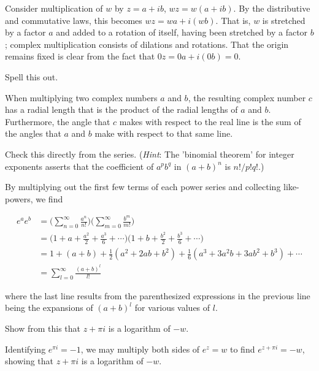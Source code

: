\documentclass[../the-road-to-reality.tex]{subfiles}
\begin{document}
\begin{questions}
\begin{solution}
	Consider multiplication of $w$ by $z = a + ib$, $wz = w(a + ib)$. By the distributive and commutative laws, this becomes $wz = wa + i(wb)$. That is, $w$ is stretched by a factor $a$ and added to a rotation of itself, having been stretched by a factor $b$; complex multiplication consists of dilations and rotations. That the origin remains fixed is clear from the fact that $0z = 0a + i(0b) = 0$.
\end{solution}

\question Spell this out.

\begin{solution}
	When multiplying two complex numbers $a$ and $b$, the resulting complex number $c$ has a radial length that is the product of the radial lengths of $a$ and $b$. Furthermore, the angle that $c$ makes with respect to the real line is the sum of the angles that $a$ and $b$ make with respect to that same line.
\end{solution}

\question Check this directly from the series. (\textit{Hint}: The 'binomial theorem' for integer exponents asserts that the coefficient of $a^pb^q$ in $(a + b)^n$ is $n!/p!q!$.)

\begin{solution}
	By multiplying out the first few terms of each power series and collecting like-powers, we find

	\begin{align*}
		e^ae^b &= \Big(\sum_{n=0}^{\infty}\frac{a^n}{n!}\Big)\Big(\sum_{m=0}^{\infty}\frac{b^m}{m!}\Big) \\
		&= \Big(1 + a + \frac{a^2}{2} + \frac{a^3}{6} + \cdots\Big)\Big(1 + b + \frac{b^2}{2} + \frac{b^3}{6} + \cdots\big) \\
		&= 1 + (a + b) + \frac{1}{2}(a^2 + 2ab + b^2) + \frac{1}{6}(a^3 + 3a^2b + 3ab^2 + b^3) + \cdots \\
		&= \sum_{l=0}^{\infty}\frac{(a + b)^l}{l!} 
	\end{align*}

	where the last line results from the parenthesized expressions in the previous line being the expansions of $(a + b)^l$ for various values of $l$.
\end{solution}

\question Show from this that $z + \pi{i}$ is a logarithm of $-w$.

\begin{solution}
	Identifying $e^{\pi{i}} = {-1}$, we may multiply both sides of $e^z=w$ to find $e^{z + {\pi}i}={-w}$, showing that $z + {\pi}i$ is a logarithm of $-w$.
\end{solution}


\end{questions}
\end{document}

